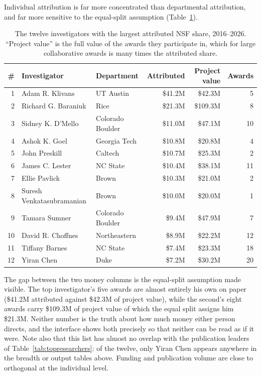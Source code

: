 \documentclass[11pt]{article}
\begin{document}
Individual attribution is far more concentrated than departmental attribution,
and far more sensitive to the equal-split assumption
(Table~\ref{tab:nsffaculty}).

\begin{table}[t]
\centering
\small
\caption{The twelve investigators with the largest attributed NSF share,
2016--2026. ``Project value'' is the full value of the awards they participate
in, which for large collaborative awards is many times the attributed share.}
\label{tab:nsffaculty}
\begin{tabular}{rllrrr}
\toprule
\# & Investigator & Department & Attributed & Project value & Awards \\
\midrule
1  & Adam R. Klivans           & UT Austin        & \$41.2M & \$42.3M  & 5  \\
2  & Richard G. Baraniuk       & Rice             & \$21.3M & \$109.3M & 8  \\
3  & Sidney K. D'Mello         & Colorado Boulder & \$11.0M & \$47.1M  & 10 \\
4  & Ashok K. Goel             & Georgia Tech     & \$10.8M & \$20.8M  & 4  \\
5  & John Preskill             & Caltech          & \$10.7M & \$25.3M  & 2  \\
6  & James C. Lester           & NC State         & \$10.4M & \$38.1M  & 11 \\
7  & Ellie Pavlick             & Brown            & \$10.3M & \$21.0M  & 2  \\
8  & Suresh Venkatasubramanian & Brown            & \$10.0M & \$20.0M  & 1  \\
9  & Tamara Sumner             & Colorado Boulder & \$9.4M  & \$47.9M  & 7  \\
10 & David R. Choffnes         & Northeastern     & \$8.9M  & \$22.2M  & 12 \\
11 & Tiffany Barnes            & NC State         & \$7.4M  & \$23.3M  & 18 \\
12 & Yiran Chen                & Duke             & \$7.2M  & \$30.2M  & 20 \\
\bottomrule
\end{tabular}
\end{table}

The gap between the two money columns is the equal-split assumption made
visible. The top investigator's five awards are almost entirely his own on
paper (\$41.2M attributed against \$42.3M of project value), while the second's
eight awards carry \$109.3M of project value of which the equal split assigns
him \$21.3M. Neither number is the truth about how much money either person
directs, and the interface shows both precisely so that neither can be read as
if it were. Note also that this list has almost no overlap with the publication
leaders of Table~\ref{tab:topresearchers}: of the twelve, only Yiran Chen
appears anywhere in the breadth or output tables above. Funding and publication
volume are close to orthogonal at the individual level.
\end{document}
